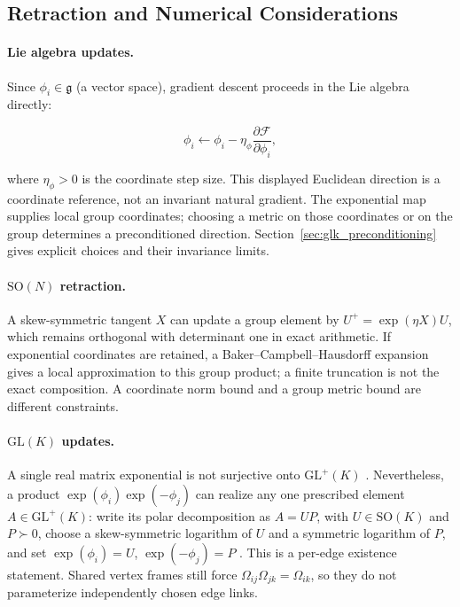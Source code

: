 \documentclass[twoside,11pt]{article}
\begin{document}
\subsection{Retraction and Numerical Considerations}

\paragraph{Lie algebra updates.} Since $\phi_i \in \mathfrak{g}$ (a vector space), gradient descent proceeds in the Lie algebra directly:

\begin{equation}
\phi_i \leftarrow \phi_i - \eta_\phi \frac{\partial \mathcal{F}}{\partial \phi_i},
\label{eq:phi_update}
\end{equation}

where $\eta_\phi>0$ is the coordinate step size. This displayed Euclidean direction is a coordinate reference, not an invariant natural gradient. The exponential map supplies local group coordinates; choosing a metric on those coordinates or on the group determines a preconditioned direction. Section~\ref{sec:glk_preconditioning} gives explicit choices and their invariance limits.

\paragraph{$\mathrm{SO}(N)$ retraction.} A skew-symmetric tangent $X$ can update a group element by $U^+=\exp(\eta X)U$, which remains orthogonal with determinant one in exact arithmetic. If exponential coordinates are retained, a Baker--Campbell--Hausdorff expansion gives a local approximation to this group product; a finite truncation is not the exact composition. A coordinate norm bound and a group metric bound are different constraints.

\paragraph{$\mathrm{GL}(K)$ updates.} A single real matrix exponential is not surjective onto $\mathrm{GL}^+(K)$ \citep{culver1966existence}. Nevertheless, a product $\exp(\phi_i)\exp(-\phi_j)$ can realize any one prescribed element $A\in\mathrm{GL}^+(K)$: write its polar decomposition as $A=UP$, with $U\in\mathrm{SO}(K)$ and $P\succ0$, choose a skew-symmetric logarithm of $U$ and a symmetric logarithm of $P$, and set $\exp(\phi_i)=U$, $\exp(-\phi_j)=P$ \citep[\S8]{Higham2008}. This is a per-edge existence statement. Shared vertex frames still force $\Omega_{ij}\Omega_{jk}=\Omega_{ik}$, so they do not parameterize independently chosen edge links.
\end{document}

